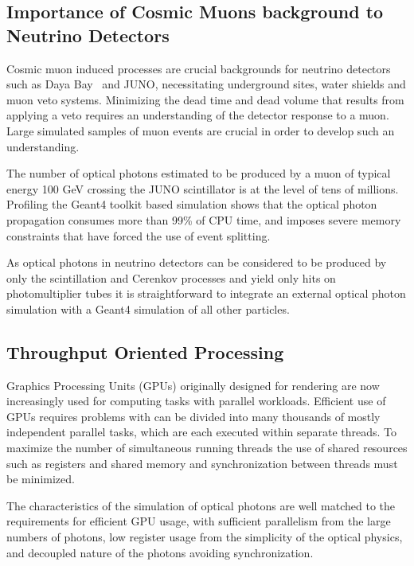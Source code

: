 \documentclass{webofc}
\begin{document}
\subsection{Importance of Cosmic Muons background to Neutrino Detectors}

Cosmic muon induced processes are crucial backgrounds for neutrino
detectors such as Daya Bay~\cite{dyb} and JUNO\cite{juno},
necessitating underground sites, water shields and muon veto systems.
Minimizing the dead time and dead volume that results from applying
a veto requires an understanding of the detector response to a muon.
Large simulated samples of muon events are crucial in order to
develop such an understanding.

The number of optical photons estimated to be produced by a muon of
typical energy 100 GeV crossing the JUNO scintillator is at the level of tens of millions.
Profiling the Geant4 toolkit based simulation shows that the optical photon propagation 
consumes more than 99\% of CPU time, and imposes severe memory constraints that have forced
the use of event splitting.  

As optical photons in neutrino detectors can be considered to be produced
by only the scintillation and Cerenkov processes and yield only hits
on photomultiplier tubes it is straightforward to integrate an
external optical photon simulation with a Geant4 simulation of all other particles.

\subsection{Throughput Oriented Processing}

Graphics Processing Units (GPUs) originally designed for rendering 
are now increasingly used for computing tasks with parallel workloads.
Efficient use of GPUs requires problems with can be divided into 
many thousands of mostly independent parallel tasks, which are 
each executed within separate threads. To maximize the number of simultaneous 
running threads the use of shared resources such as registers and shared 
memory and synchronization between threads must be minimized.

The characteristics of the simulation of optical photons are well matched to 
the requirements for efficient GPU usage, with sufficient parallelism from 
the large numbers of photons, low register usage from the simplicity of 
the optical physics, and decoupled nature of the photons avoiding synchronization.
\end{document}
